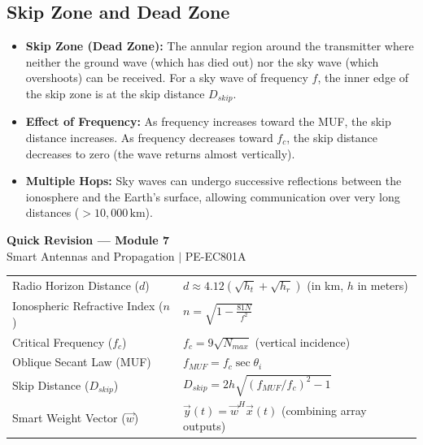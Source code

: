 \documentclass[12pt,a4paper]{article}
\renewcommand{\arraystretch}{1.45}
\begin{document}
\subsection{Skip Zone and Dead Zone}
\begin{itemize}[leftmargin=*, itemsep=3pt]
  \item \textbf{Skip Zone (Dead Zone):} The annular region around the transmitter where neither the ground wave (which has died out) nor the sky wave (which overshoots) can be received. For a sky wave of frequency $f$, the inner edge of the skip zone is at the skip distance $D_{skip}$.
  \item \textbf{Effect of Frequency:} As frequency increases toward the MUF, the skip distance increases. As frequency decreases toward $f_c$, the skip distance decreases to zero (the wave returns almost vertically).
  \item \textbf{Multiple Hops:} Sky waves can undergo successive reflections between the ionosphere and the Earth's surface, allowing communication over very long distances ($> 10{,}000\,\text{km}$).
\end{itemize}

\newpage
\begin{center}
  {\large\bfseries\color{myred} Quick Revision --- Module 7}\\[3pt]
  {\small\color{mydark} Smart Antennas and Propagation $|$ PE-EC801A}
\end{center}
\noindent{\color{myred}\rule{\linewidth}{1.2pt}}
\vspace{4pt}

\begin{tcolorbox}[formulabox, title={\textbf{Key Formulas and Metrics at a Glance}}]
\renewcommand{\arraystretch}{1.35}
\begin{tabularx}{\linewidth}{B{5.2cm} X}
Radio Horizon Distance ($d$) & $d \approx 4.12 (\sqrt{h_t} + \sqrt{h_r})$ \quad (in km, $h$ in meters) \\[4pt]
Ionospheric Refractive Index ($n$) & $n = \sqrt{1 - \frac{81 N}{f^2}}$ \\[4pt]
Critical Frequency ($f_c$) & $f_c = 9\sqrt{N_{max}}$ \quad (vertical incidence) \\[4pt]
Oblique Secant Law (MUF) & $f_{MUF} = f_c \sec\theta_i$ \\[4pt]
Skip Distance ($D_{skip}$) & $D_{skip} = 2 h \sqrt{(f_{MUF}/f_c)^2 - 1}$ \\[4pt]
Smart Weight Vector ($\vec{w}$) & $\vec{y}(t) = \vec{w}^H \vec{x}(t)$ \quad (combining array outputs) \\
\end{tabularx}
\end{tcolorbox}
\end{document}
